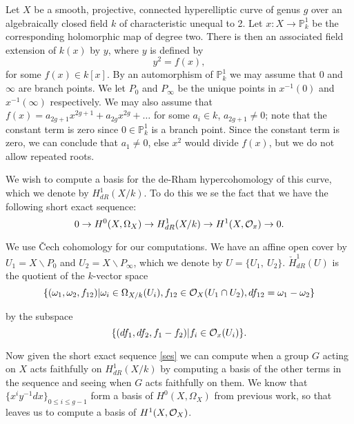 \documentclass[draft, 11pt]{article} %
\title{}
\author{}
\theoremstyle{plain}
\theoremstyle{remark}
\newcommand{\cO}{{\cal O}}
\newcommand{\ra}{\rightarrow}
\begin{document}
\maketitle
{}

Let $X$ be a smooth, projective, connected hyperelliptic curve of genus $g$ over an algebraically closed field $k$ of characteristic unequal to 2.
Let $x:X\rightarrow \mathbb P_k^1$ be the corresponding holomorphic map of degree two.
There is then an associated field extension of $k(x)$ by $y$, where $y$ is defined by
\[
y^2 = f(x),
\]
for some $f(x)\in k[x]$.
By an automorphism of $\mathbb P_k^1$ we may assume that $0$ and $\infty$ are branch points.
We let $P_0$ and $P_\infty$ be the unique points in $x^{-1}(0)$ and $x^{-1}(\infty)$ respectively.
We may also assume that $f(x) = a_{2g+1}x^{2g+1} + a_{2g}x^{2g} + \ldots $ for some $a_i \in k$, $a_{2g+1} \neq 0$; note that the constant term is zero since $0\in \mathbb P_k^1$ is a branch point.
Since the constant term is zero, we can conclude that $a_1 \neq 0$, else $x^2$ would divide $f(x)$, but we do not allow repeated roots.

We wish to compute a basis for the de-Rham hypercohomology of this curve, which we denote by $H^1_{dR}(X/k)$. 
To do this we se the fact that we have the following short exact sequence:
\begin{equation}\label{ses}
0 \ra H^0(X,\Omega_X) \ra H^1_{dR}(X/k) \ra H^1(X,\cO_x) \ra 0.
\end{equation}

We use \v{C}ech cohomology for our computations.
We have an affine open cover by $U_1 = X\backslash P_0$ and $U_2 = X \backslash P_\infty$, which we denote by $U = \{ U_1, \ U_2\}$.
  $\check{H}_{dR}^1(U)$ is the quotient of the $k$-vector space 
\[
\{(\omega_1, \omega_2, f_{12}) | \omega_i\in \Omega_{X/k}(U_i), f_{12}\in \cO_X(U_1 \cap U_2), df_{12} = \omega_1 - \omega_2\}
\]

by the subspace
\[
\{ (df_1, df_2, f_1-f_2)|f_i \in \cO_x(U_i)\}.
\]

Now given the short exact sequence \eqref{ses} we can compute when a group $G$ acting on $X$ acts faithfully on $H^1_{dR}(X/k)$ by computing a basis of the other terms in the sequence and seeing when $G$ acts faithfully on them.
We know that $\{x^iy^{-1}dx\}_{0\leq i \leq g-1}$ form a basis of $H^0(X,\Omega_X)$ from previous work, so that leaves us to compute a basis of $H^1(X,\cO_X)$.
\end{document}
